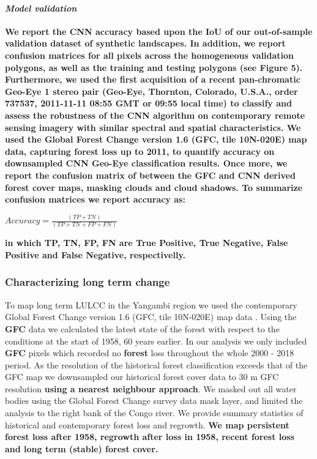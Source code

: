 \documentclass[remote sensing,article,submit,moreauthors,pdftex]{mdpi}
\begin{document}
\hypertarget{model-validation}{%
\paragraph{\texorpdfstring{\emph{Model
validation}}{Model validation}}\label{model-validation}}

\textbf{We report the CNN accuracy based upon the IoU of our
out-of-sample validation dataset of synthetic landscapes. In addition,
we report confusion matrices for all pixels across the homogeneous
validation polygons, as well as the training and testing polygons (see
Figure 5). Furthermore, we used the first acquisition of a recent
pan-chromatic Geo-Eye 1 stereo pair (Geo-Eye, Thornton, Colorado,
U.S.A., order 737537, 2011-11-11 08:55 GMT or 09:55 local time) to
classify and assess the robustness of the CNN algorithm on contemporary
remote sensing imagery with similar spectral and spatial
characteristics. We used the Global Forest Change version 1.6 (GFC, tile
10N-020E) \citep{hansen2013} map data, capturing forest loss up to 2011,
to quantify accuracy on downsampled CNN Geo-Eye classification results.
Once more, we report the confusion matrix of between the GFC and CNN
derived forest cover maps, masking clouds and cloud shadows. To
summarize confusion matrices we report accuracy as:}

\(Accuracy = \frac{(TP + TN)}{(TP + TN + FP + FN)}\)

\textbf{in which TP, TN, FP, FN are True Positive, True Negative, False
Positive and False Negative, respectivelly.}

\hypertarget{characterizing-long-term-change}{%
\subsubsection{Characterizing long term
change}\label{characterizing-long-term-change}}

To map long term LULCC in the Yangambi region we used the contemporary
Global Forest Change version 1.6 (GFC, tile 10N-020E) map data
\citep{hansen2013}. Using the \textbf{GFC} data we calculated the latest
state of the forest with respect to the conditions at the start of 1958,
60 years earlier. In our analysis we only included \textbf{GFC} pixels
which recorded no \textbf{forest} loss throughout the whole 2000 - 2018
period. As the resolution of the historical forest classification
exceeds that of the GFC map we downsampled our historical forest cover
data to 30 m GFC resolution \textbf{using a nearest neighbour approach}.
We masked out all water bodies using the Global Forest Change survey
data mask layer, and limited the analysis to the right bank of the Congo
river. We provide summary statistics of historical and contemporary
forest loss and regrowth. \textbf{We map persistent forest loss after
1958, regrowth after loss in 1958, recent forest loss and long term
(stable) forest cover.}
\end{document}
